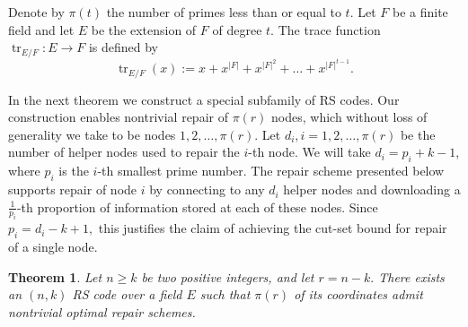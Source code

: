 \documentclass[11pt,onecolumn]{IEEEtran}
\newtheorem{theorem}{Theorem}
\DeclareMathOperator{\trace}{tr}
\begin{document}
Denote by $\pi(t)$ the number of primes less than or equal to $t$. Let $F$ be a finite field and let $E$ be the extension of $F$ of degree
$t.$ The trace function $\trace_{E/F}:E\to F$ is defined by
  $$
   \trace_{E/F}(x):=x+x^{|F|}+x^{|F|^2}+\dots+x^{|F|^{t-1}}.
   $$

In the next theorem we construct a special subfamily of RS codes. Our construction enables nontrivial repair of $\pi(r)$ nodes, which
without loss of generality we take to be nodes $1,2,\dots,\pi(r)$. Let $d_i, i=1,2,\dots,\pi(r)$ be the number of helper nodes used to repair the $i$-th node. We will take $d_i=p_i+k-1$, where $p_i$ is the $i$-th smallest prime number.  The repair scheme presented below
supports repair of node $i$ by connecting to any $d_i$ helper nodes and downloading a $\frac{1}{p_i}$-th
proportion of information stored at each of these nodes. Since $p_i=d_i-k+1,$ this justifies the claim of achieving the cut-set bound for repair of a single node.

\begin{theorem} Let $n\ge k$ be two positive integers, and let $r=n-k.$ 
There exists an $(n,k)$ RS code over a field $E$ such that $\pi(r)$ of its coordinates admit nontrivial optimal repair schemes.
\end{theorem}
\end{document}
